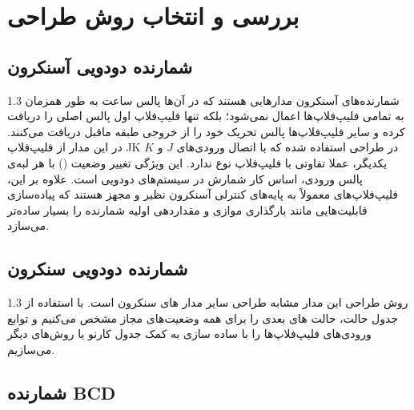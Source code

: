 \documentclass[a4paper,12pt]{article}
\numberwithin{figure}{subsection}
\begin{document}
\newpage

\section{بررسی و انتخاب روش طراحی}
\leavevmode\par
\vspace{0.3cm}

\subsection{شمارنده دودویی آسنکرون}
\leavevmode\par
\vspace{0.2cm}


\begin{spacing}{1.3}
شمارنده‌های آسنکرون مدارهایی هستند که در آن‌ها پالس ساعت  به طور همزمان به تمامی فلیپ‌فلاپ‌ها اعمال نمی‌شود؛ بلکه تنها فلیپ‌فلاپ اول پالس اصلی را دریافت کرده و سایر فلیپ‌فلاپ‌ها پالس تحریک خود را از خروجی طبقه ماقبل دریافت می‌کنند. در این مدار از  فلیپ‌فلاپ JK در طراحی استفاده شده که با اتصال ورودی‌های $J$ و $K$ یکدیگر، عملا تفاوتی با فلیپ‌فلاپ نوع  ندارد. این ویژگی تغییر وضعیت () با هر لبه‌ی پالس ورودی، اساس کار شمارش در سیستم‌های دودویی است. علاوه بر این، فلیپ‌فلاپ‌های  معمولاً به پایه‌های کنترلی آسنکرون نظیر  و  مجهز هستند که پیاده‌سازی قابلیت‌هایی مانند بارگذاری موازی و مقداردهی اولیه شمارنده را بسیار ساده‌تر می‌سازد.
\end{spacing}

\subsection{شمارنده دودویی سنکرون}
\leavevmode\par
\vspace{0.2cm}

\begin{spacing}{1.3}
روش طراحی این مدار مشابه طراحی سایر مدار های سنکرون است. با استفاده از جدول حالت، حالت های بعدی را برای همه وضعیت‌های مجاز مشخص می‌کنیم و توابع ورودی‌های فلیپ‌فلاپ‌ها را با ساده سازی به کمک جدول کارنو یا روش‌های دیگر می‌سازیم.
\end{spacing}

\subsection{شمارنده BCD}
\leavevmode\par
\vspace{0.2cm}
\end{document}
